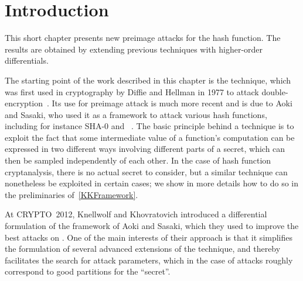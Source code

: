 \section{Introduction}

This short chapter presents new preimage attacks for the \shaone hash function.
The results are obtained by extending previous techniques with higher-order differentials.

\medskip

The starting point of the work described in this chapter is the \mitm technique, which
was first used in cryptography by Diffie and Hellman in 1977 to attack double-encryption~\cite{DH77}.
Its use for preimage attack is much more recent and is due to Aoki and Sasaki, who used it as a framework to
attack various hash functions, including for instance SHA-0 and \shaone~\cite{AS09}.
The basic principle behind a \mitm technique is to exploit the fact that some intermediate value of
a function's computation can be expressed
in two different ways involving different parts of a secret, which can then be sampled independently of
each other. In the case of hash function cryptanalysis, there is no actual secret to consider, but a
similar technique can nonetheless be exploited in certain cases; we show in more details how to do
so in the preliminaries of~\autoref{KKFramework}.

At CRYPTO~2012, Knellwolf and Khovratovich introduced a differential formulation of the \mitm framework
of Aoki and Sasaki, which they used to improve the best attacks on \shaone. One of the main interests
of their approach is that it simplifies the formulation of several advanced extensions of
the \mitm technique, and thereby facilitates the search for attack parameters, which in the case
of \mitm attacks roughly correspond to good partitions for the ``secret''.


